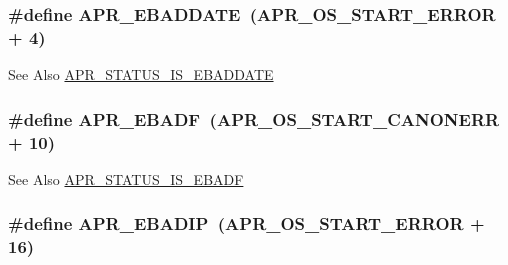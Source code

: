 \hypertarget{group___a_p_r___error_ga7911720c540a929cc08a2c25e606b56e}{
\subsubsection[{A\-P\-R\-\_\-\-E\-B\-A\-D\-D\-A\-T\-E}]{\setlength{\rightskip}{0pt plus 5cm}\#define A\-P\-R\-\_\-\-E\-B\-A\-D\-D\-A\-T\-E~({\bf A\-P\-R\-\_\-\-O\-S\-\_\-\-S\-T\-A\-R\-T\-\_\-\-E\-R\-R\-O\-R} + 4)}}\label{group___a_p_r___error_ga7911720c540a929cc08a2c25e606b56e}
\begin{DoxySeeAlso}{See Also}
\hyperlink{group___a_p_r___s_t_a_t_u_s___i_s_gaf1313bed3538d6d57995bca164ebac20}{A\-P\-R\-\_\-\-S\-T\-A\-T\-U\-S\-\_\-\-I\-S\-\_\-\-E\-B\-A\-D\-D\-A\-T\-E} 
\end{DoxySeeAlso}
\hypertarget{group___a_p_r___error_ga204df8a37a5c7fd6b2c74ea098fbac02}{
\subsubsection[{A\-P\-R\-\_\-\-E\-B\-A\-D\-F}]{\setlength{\rightskip}{0pt plus 5cm}\#define A\-P\-R\-\_\-\-E\-B\-A\-D\-F~({\bf A\-P\-R\-\_\-\-O\-S\-\_\-\-S\-T\-A\-R\-T\-\_\-\-C\-A\-N\-O\-N\-E\-R\-R} + 10)}}\label{group___a_p_r___error_ga204df8a37a5c7fd6b2c74ea098fbac02}
\begin{DoxySeeAlso}{See Also}
\hyperlink{group___a_p_r___s_t_a_t_u_s___i_s_gaa843153a73806cca500287940e9f175f}{A\-P\-R\-\_\-\-S\-T\-A\-T\-U\-S\-\_\-\-I\-S\-\_\-\-E\-B\-A\-D\-F} 
\end{DoxySeeAlso}
\hypertarget{group___a_p_r___error_ga96180fb8075ae0150bfed50c2e7f7a59}{
\subsubsection[{A\-P\-R\-\_\-\-E\-B\-A\-D\-I\-P}]{\setlength{\rightskip}{0pt plus 5cm}\#define A\-P\-R\-\_\-\-E\-B\-A\-D\-I\-P~({\bf A\-P\-R\-\_\-\-O\-S\-\_\-\-S\-T\-A\-R\-T\-\_\-\-E\-R\-R\-O\-R} + 16)}}\label{group___a_p_r___error_ga96180fb8075ae0150bfed50c2e7f7a59}
